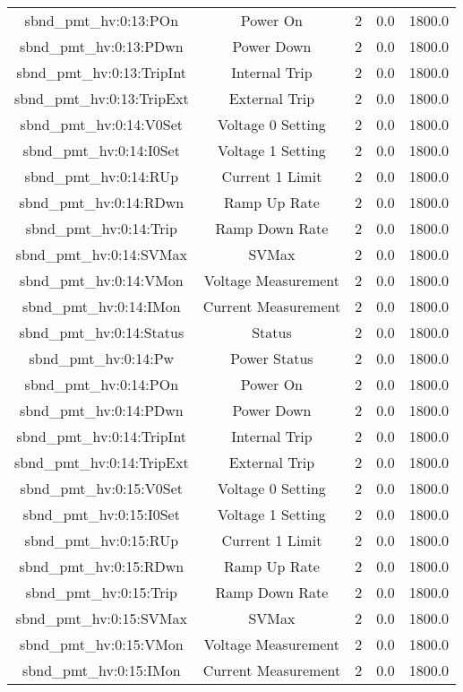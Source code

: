 \begin{center}
\begin{longtable}{c | c c c c }
sbnd\_pmt\_hv:0:13:POn & Power On & 2 & 0.0 & 1800.0\\ 
sbnd\_pmt\_hv:0:13:PDwn & Power Down & 2 & 0.0 & 1800.0\\ 
sbnd\_pmt\_hv:0:13:TripInt & Internal Trip & 2 & 0.0 & 1800.0\\ 
sbnd\_pmt\_hv:0:13:TripExt & External Trip & 2 & 0.0 & 1800.0\\ 
sbnd\_pmt\_hv:0:14:V0Set & Voltage 0 Setting & 2 & 0.0 & 1800.0\\ 
sbnd\_pmt\_hv:0:14:I0Set & Voltage 1 Setting & 2 & 0.0 & 1800.0\\ 
sbnd\_pmt\_hv:0:14:RUp & Current 1 Limit & 2 & 0.0 & 1800.0\\ 
sbnd\_pmt\_hv:0:14:RDwn & Ramp Up Rate & 2 & 0.0 & 1800.0\\ 
sbnd\_pmt\_hv:0:14:Trip & Ramp Down Rate & 2 & 0.0 & 1800.0\\ 
sbnd\_pmt\_hv:0:14:SVMax & SVMax & 2 & 0.0 & 1800.0\\ 
sbnd\_pmt\_hv:0:14:VMon & Voltage Measurement & 2 & 0.0 & 1800.0\\ 
sbnd\_pmt\_hv:0:14:IMon & Current Measurement & 2 & 0.0 & 1800.0\\ 
sbnd\_pmt\_hv:0:14:Status & Status & 2 & 0.0 & 1800.0\\ 
sbnd\_pmt\_hv:0:14:Pw & Power Status & 2 & 0.0 & 1800.0\\ 
sbnd\_pmt\_hv:0:14:POn & Power On & 2 & 0.0 & 1800.0\\ 
sbnd\_pmt\_hv:0:14:PDwn & Power Down & 2 & 0.0 & 1800.0\\ 
sbnd\_pmt\_hv:0:14:TripInt & Internal Trip & 2 & 0.0 & 1800.0\\ 
sbnd\_pmt\_hv:0:14:TripExt & External Trip & 2 & 0.0 & 1800.0\\ 
sbnd\_pmt\_hv:0:15:V0Set & Voltage 0 Setting & 2 & 0.0 & 1800.0\\ 
sbnd\_pmt\_hv:0:15:I0Set & Voltage 1 Setting & 2 & 0.0 & 1800.0\\ 
sbnd\_pmt\_hv:0:15:RUp & Current 1 Limit & 2 & 0.0 & 1800.0\\ 
sbnd\_pmt\_hv:0:15:RDwn & Ramp Up Rate & 2 & 0.0 & 1800.0\\ 
sbnd\_pmt\_hv:0:15:Trip & Ramp Down Rate & 2 & 0.0 & 1800.0\\ 
sbnd\_pmt\_hv:0:15:SVMax & SVMax & 2 & 0.0 & 1800.0\\ 
sbnd\_pmt\_hv:0:15:VMon & Voltage Measurement & 2 & 0.0 & 1800.0\\ 
sbnd\_pmt\_hv:0:15:IMon & Current Measurement & 2 & 0.0 & 1800.0\\ 

\end{longtable}
\end{center}
